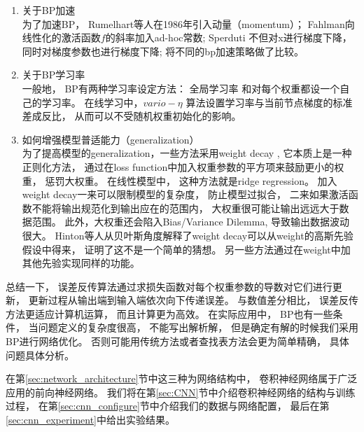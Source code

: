 \begin{enumerate}
\item 关于BP加速\\
为了加速BP， Rumelhart等人在1986年引入动量（momentum）\cite{rumelhart1985learning}； Fahlman向线性化的激活函数$f$的斜率加入ad-hoc常数\cite{fahlman1988empirical}; Sperduti 
不但对x进行梯度下降，同时对梯度参数也进行梯度下降; \cite{sarkar1995methods} 将不同的bp加速策略做了比较。
\item 关于BP学习率\\
一般地， BP有两种学习率设定方法： 全局学习率 \cite{lapedes1988neural,vogl1988accelerating,lecun1993automatic} 和对每个权重都设一个自己的学习率\cite{jacobs1988increased,almeida1990speeding}。 在线学习中，$vario-\eta$\cite{neuneier1998train} 算法设置学习率与当前节点梯度的标准差成反比， 从而可以不受随机权重初始化的影响。

\item 如何增强模型普适能力（generalization）\\
为了提高模型的generalization，一些方法采用weight decay \cite{hanson1989comparing,weigend1991generalization}, 它本质上是一种正则化方法， 通过在loss function中加入权重参数的平方项来鼓励更小的权重， 惩罚大权重。 在线性模型中， 这种方法就是ridge regression。 加入weight decay一来可以限制模型的复杂度， 防止模型过拟合， 二来如果激活函数不能将输出规范化到输出应在的范围内， 大权重很可能让输出远远大于数据范围。 此外，大权重还会陷入Bias/Variance Dilemma\cite{geman1992neural}, 导致输出数据波动很大。 Hinton等人\cite{hinton1993keeping}从贝叶斯角度解释了weight decay可以从weight的高斯先验假设中得来， 证明了这不是一个简单的猜想。 另一些方法通过在weight中加其他先验实现同样的功能\cite{hastie1990generalized,hastie2009elements,mosteller1968data,mackay1992evidence}。

\end{enumerate}

	
总结一下， 误差反传算法通过求损失函数对每个权重参数的导数对它们进行更新， 更新过程从输出端到输入端依次向下传递误差。 与数值差分相比， 误差反传方法更适应计算机运算， 而且计算更为高效。 在实际应用中， BP也有一些条件， 当问题定义的复杂度很高， 不能写出解析解， 但是确定有解的时候我们采用BP进行网络优化。 否则可能用传统方法或者查找表方法会更为简单精确， 具体问题具体分析。 


在第\ref{sec:network_architecture}节中这三种为网络结构中， 卷积神经网络属于广泛应用的前向神经网络。 我们将在第\ref{sec:CNN}节中介绍卷积神经网络的结构与训练过程， 在第\ref{sec:cnn_configure}节中介绍我们的数据与网络配置， 最后在第\ref{sec:cnn_experiment}中给出实验结果。


